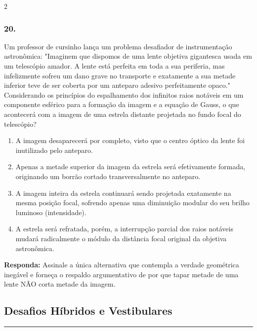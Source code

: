 \documentclass[twoside, 10pt, a4paper]{article}
\newlength{\espacoPosTitulo}\setlength{\espacoPosTitulo}{0.3cm}
\newlength{\espacoQuestao}\setlength{\espacoQuestao}{0.2cm}
\newlength{\espacoAlt}\setlength{\espacoAlt}{0.2cm}
\begin{document}
\begin{multicols*}{2}
\subsubsection*{20.} Um professor de cursinho lança um problema desafiador de instrumentação astronômica: "Imaginem que dispomos de uma lente objetiva gigantesca usada em um telescópio amador. A lente está perfeita em toda a sua periferia, mas infelizmente sofreu um dano grave no transporte e exatamente a sua metade inferior teve de ser coberta por um anteparo adesivo perfeitamente opaco."
Considerando os princípios do espalhamento dos infinitos raios notáveis em um componente esférico para a formação da imagem e a equação de Gauss, o que acontecerá com a imagem de uma estrela distante projetada no fundo focal do telescópio?
\begin{enumerate}[label=\alph*), itemsep=\espacoAlt]
\item A imagem desaparecerá por completo, visto que o centro óptico da lente foi inutilizado pelo anteparo.
\item Apenas a metade superior da imagem da estrela será efetivamente formada, originando um borrão cortado transversalmente no anteparo.
\item A imagem inteira da estrela continuará sendo projetada exatamente na mesma posição focal, sofrendo apenas uma diminuição modular do seu brilho luminoso (intensidade).
\item A estrela será refratada, porém, a interrupção parcial dos raios notáveis mudará radicalmente o módulo da distância focal original da objetiva astronômica.
\end{enumerate}
\begin{boxresponda}
\textbf{Responda:} Assinale a única alternativa que contempla a verdade geométrica inegável e forneça o respaldo argumentativo de por que tapar metade de uma lente NÃO corta metade da imagem.
\end{boxresponda}
\par\vspace{\espacoQuestao}
\subsection*{Desafios Híbridos e Vestibulares}
\vspace{-0.2cm}\noindent\rule{\linewidth}{1.5pt} 
\par\vspace{\espacoPosTitulo}


\end{multicols*}
\end{document}
